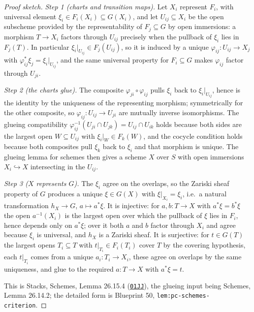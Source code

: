 \documentclass[11pt]{article}
\theoremstyle{plain}
\theoremstyle{definition}
\begin{document}
\begin{proof}[Proof sketch]
\emph{Step 1 (charts and transition maps).}  Let $X_i$ represent $F_i$,
with universal element $\xi_i\in F_i(X_i)\subseteq G(X_i)$, and let
$U_{ij}\subseteq X_i$ be the open subscheme provided by the
representability of $F_j\subseteq G$ by open immersions:  a morphism
$T\to X_i$ factors through $U_{ij}$ precisely when the pullback of
$\xi_i$ lies in $F_j(T)$.  In particular
$\xi_i|_{U_{ij}}\in F_j(U_{ij})$, so it is induced by a unique
$\varphi_{ij}:U_{ij}\to X_j$ with
$\varphi_{ij}^*\xi_j=\xi_i|_{U_{ij}}$, and the same universal property
for $F_i\subseteq G$ makes $\varphi_{ij}$ factor through $U_{ji}$.

\emph{Step 2 (the charts glue).}  The composite
$\varphi_{ji}\circ\varphi_{ij}$ pulls $\xi_i$ back to $\xi_i|_{U_{ij}}$,
hence is the identity by the uniqueness of the representing morphism;
symmetrically for the other composite, so
$\varphi_{ij}:U_{ij}\to U_{ji}$ are mutually inverse isomorphisms.  The
glueing compatibility
$\varphi_{ij}^{-1}(U_{ji}\cap U_{jk})=U_{ij}\cap U_{ik}$ holds because
both sides are the largest open $W\subseteq U_{ij}$ with
$\xi_i|_W\in F_k(W)$, and the cocycle condition holds because both
composites pull $\xi_k$ back to $\xi_i$ and that morphism is unique.
The glueing lemma for schemes then gives a scheme $X$ over $S$ with open
immersions $X_i\hookrightarrow X$ intersecting in the $U_{ij}$.

\emph{Step 3 ($X$ represents $G$).}  The $\xi_i$ agree on the overlaps,
so the Zariski sheaf property of $G$ produces a unique $\xi\in G(X)$
with $\xi|_{X_i}=\xi_i$, i.e.\ a natural transformation $h_X\to G$,
$a\mapsto a^*\xi$.  It is injective:  for $a,b:T\to X$ with
$a^*\xi=b^*\xi$ the open $a^{-1}(X_i)$ is the largest open over which
the pullback of $\xi$ lies in $F_i$, hence depends only on $a^*\xi$;
over it both $a$ and $b$ factor through $X_i$ and agree because $\xi_i$
is universal, and $h_X$ is a Zariski sheaf.  It is surjective:  for
$t\in G(T)$ the largest opens $T_i\subseteq T$ with
$t|_{T_i}\in F_i(T_i)$ cover $T$ by the covering hypothesis, each
$t|_{T_i}$ comes from a unique $a_i:T_i\to X_i$, these agree on overlaps
by the same uniqueness, and glue to the required $a:T\to X$ with
$a^*\xi=t$.

This is Stacks, Schemes, Lemma 26.15.4
(\href{https://stacks.math.columbia.edu/tag/01JJ}{\texttt{01JJ}}), the glueing input being Schemes,
Lemma 26.14.2;  the detailed form is Blueprint 50,
\texttt{lem:pc-schemes-criterion}.
\end{proof}
\end{document}
